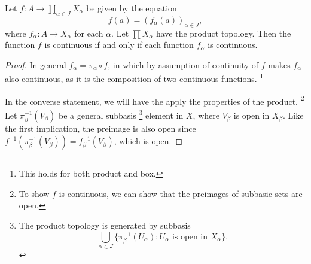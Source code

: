 \documentclass[../../main.tex]{subfiles}
\begin{document}
\begin{problem}[Theorem 19.6]
    Let $f : A \to \prod_{\alpha \in J} X_\alpha$ be given by the equation
    \begin{equation}
        f(a) = (f_\alpha(a))_{\alpha \in J},
    \end{equation}
    where $f_\alpha : A \to X_\alpha$ for each $\alpha$.
    Let $\prod X_\alpha$ have the product topology.
    Then the function $f$ is continuous if and only if each function $f_\alpha$ is continuous.
\end{problem}

\begin{proof}
    In general $f_\alpha = \pi_\alpha \circ f$, in which by assumption of continuity of $f$ makes $f_\alpha$ also continuous, as it is the composition of two continuous functions.
    \footnote{This holds for both product and box.}

    In the converse statement, we will have the apply the properties of the product.
    \footnote{To show $f$ is continuous, we can show that the preimages of subbasic sets are open.}
    Let $\pi_\beta^{-1}(V_\beta)$ be a general subbasis
    \footnote{The product topology is generated by subbasis
        \begin{equation*}
            \bigcup_{\alpha \in J} \{ \pi_\beta^{-1}(U_\alpha) : U_\alpha \text{ is open in } X_\alpha \}.
        \end{equation*}
    }
    element in $X$,
    where $V_\beta$ is open in $X_\beta$.
    Like the first implication, the preimage is also open since
    $f^{-1}(\pi_\beta^{-1}(V_\beta)) = f_\beta^{-1}(V_\beta)$, which is open.
\end{proof}
\end{document}
